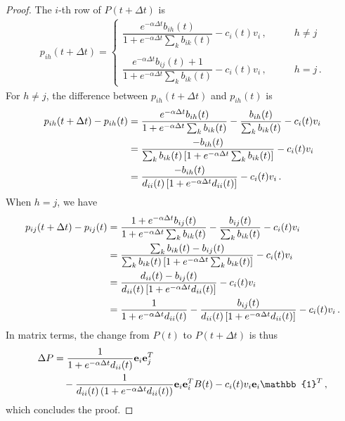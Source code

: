 \documentclass[journal,transmag]{IEEEtran}
\newcommand{\vecb}[1]{\mathbf{#1}}
\newcommand{\tdt}{t+\Delta t}
\newcommand{\dP}{\Delta P}
\begin{document}
\begin{proof}
The $i$-th row of $P(t + \Delta t)$ is
\begin{align}
  p_{ih}(\tdt) =
  \begin{cases}
    \dfrac{e^{-\alpha \Delta t}b_{ih}(t)}{1+e^{-\alpha \Delta t}\sum_k
      b_{ik}(t)} - c_{i}(t)v_i\,, \qquad & h \neq j \\
    \\
    \dfrac{e^{-\alpha \Delta t}b_{ij}(t)+1}{1+e^{-\alpha \Delta
        t}\sum_k b_{ik}(t)} - c_{i}(t)v_i\,, \qquad & h = j\,.
  \end{cases}
\end{align}
For $h \neq j$, the difference between $p_{ih}(\tdt)$ and $p_{ih}(t)$ is
{\tiny
\begin{align}
  p_{ih}(\tdt) - p_{ih}(t) &= \frac{e^{-\alpha \Delta t}b_{ih}(t)}
  {1+e^{-\alpha \Delta t}\sum_k b_{ik}(t)} - \frac{b_{ih}(t)}{\sum_k
    b_{ik}(t)} - c_i(t)v_i  \notag \\
  &= \frac{-b_{ih}(t)}{\sum_k
    b_{ik}(t)\left[1 + e^{-\alpha \Delta t}\sum_k b_{ik}(t)\right]} -
  c_i(t)v_i \notag \\
  &= \frac{-b_{ih}(t)}{d_{ii}(t)\left[1+e^{-\alpha \Delta
        t}d_{ii}(t)\right]} - c_i(t)v_i\,.
\end{align}}
When $h = j$, we have
{\tiny
\begin{align}
  p_{ij}(t+ \Delta t) - p_{ij}(t) &= \frac{1+e^{-\alpha \Delta
      t}b_{ij}(t)} {1+e^{-\alpha \Delta t}\sum_k b_{ik}(t)} -
  \frac{b_{ij}(t)}{\sum_k b_{ik}(t)} - c_i(t)v_i \notag \\
  &= \frac{\sum_k
    b_{ik}(t)-b_{ij}(t)} {\sum_k b_{ik}(t)\left[1+ e^{-\alpha \Delta
        t}\sum_k b_{ik}(t)\right]} - c_i(t)v_i \notag \\
  &= \frac{d_{ii}(t)-b_{ij}(t)}{d_{ii}(t)\left[1+ e^{-\alpha \Delta
        t}d_{ii}(t)\right]} - c_i(t)v_i  \notag \\
  &= \frac{1}{1+e^{-\alpha
      \Delta t}d_{ii}(t)}-\frac{b_{ij}(t)}
       {d_{ii}(t)\left[1+e^{-\alpha \Delta t}d_{ii}(t)\right]} -
       c_i(t)v_i\,.
\end{align}}
In matrix terms, the change from $P(t)$ to $P(\tdt)$ is thus
\begin{align}
  \dP  &= \frac{1}{1+e^{-\alpha \Delta t}d_{ii}(t)}\vecb{e}_{i}\vecb{e}_{j}^T \notag \\
 &\quad  - \frac{1}
  {d_{ii}(t)\left(1+e^{-\alpha \Delta t}d_{ii}(t)\right)}
  \vecb{e}_{i}\vecb{e}_{i}^T B(t) -c_i(t)v_i\vecb{e}_i\mathbb{1}^T\,,
\end{align}
which concludes the proof.
\end{proof}
\end{document}
